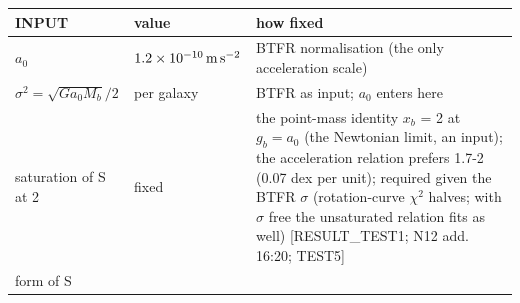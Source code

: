 \documentclass[
  10pt,
]{article}
\begin{document}
\begin{longtable}[]{@{}lll@{}}
\toprule
\begin{minipage}[b]{0.24\columnwidth}\raggedright
INPUT\strut
\end{minipage} & \begin{minipage}[b]{0.20\columnwidth}\raggedright
value\strut
\end{minipage} & \begin{minipage}[b]{0.50\columnwidth}\raggedright
how fixed\strut
\end{minipage}\tabularnewline
\midrule
\endhead
\begin{minipage}[t]{0.24\columnwidth}\raggedright
$a_0$\strut
\end{minipage} & \begin{minipage}[t]{0.20\columnwidth}\raggedright
$1.2\times10^{-10}\,{\rm m\,s^{-2}}$\strut
\end{minipage} & \begin{minipage}[t]{0.50\columnwidth}\raggedright
BTFR normalisation (the only acceleration scale)\strut
\end{minipage}\tabularnewline
\begin{minipage}[t]{0.24\columnwidth}\raggedright
$\sigma^2=\sqrt{G a_0 M_b}/2$\strut
\end{minipage} & \begin{minipage}[t]{0.20\columnwidth}\raggedright
per galaxy\strut
\end{minipage} & \begin{minipage}[t]{0.50\columnwidth}\raggedright
BTFR as input; $a_0$ enters here\strut
\end{minipage}\tabularnewline
\begin{minipage}[t]{0.24\columnwidth}\raggedright
saturation of S at 2\strut
\end{minipage} & \begin{minipage}[t]{0.20\columnwidth}\raggedright
fixed\strut
\end{minipage} & \begin{minipage}[t]{0.50\columnwidth}\raggedright
the point-mass identity $x_b$ = 2 at $g_b=a_0$ (the Newtonian limit, an input); the acceleration relation prefers 1.7-2 (0.07 dex per unit); required given the BTFR $\sigma$ (rotation-curve $\chi^2$ halves; with $\sigma$ free the unsaturated relation fits as well) {[}RESULT\_TEST1; N12 add.
16:20; TEST5{]}\strut
\end{minipage}\tabularnewline
\begin{minipage}[t]{0.24\columnwidth}\raggedright
form of S\strut

\end{minipage}
\end{longtable}
\end{document}
